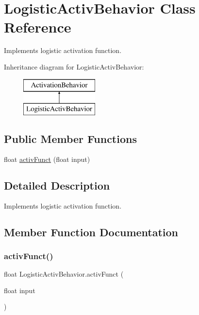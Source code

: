 \hypertarget{class_logistic_activ_behavior}{}\section{Logistic\+Activ\+Behavior Class Reference}
\label{class_logistic_activ_behavior}


Implements logistic activation function.  


Inheritance diagram for Logistic\+Activ\+Behavior\+:\begin{figure}[H]
\begin{center}
\leavevmode
\includegraphics[height=2.000000cm]{class_logistic_activ_behavior}
\end{center}
\end{figure}
\subsection*{Public Member Functions}
\begin{DoxyCompactItemize}
\item 
float \mbox{\hyperlink{class_logistic_activ_behavior_a20a20f3e29d8aad19f35067a9304ee96}{activ\+Funct}} (float input)
\end{DoxyCompactItemize}


\subsection{Detailed Description}
Implements logistic activation function. 



\subsection{Member Function Documentation}
\mbox{\label{class_logistic_activ_behavior_a20a20f3e29d8aad19f35067a9304ee96}} 
\subsubsection{\texorpdfstring{activ\+Funct()}{activFunct()}}
{\footnotesize\ttfamily float Logistic\+Activ\+Behavior.\+activ\+Funct (\begin{DoxyParamCaption}\item[{float}]{input }\end{DoxyParamCaption})}



